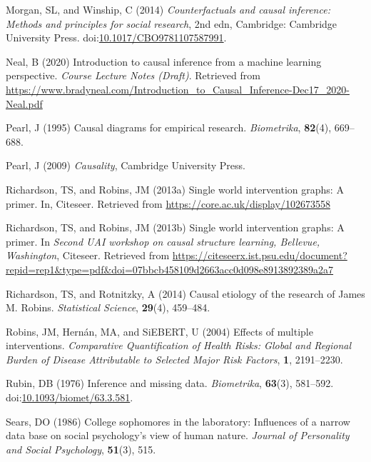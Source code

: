 \documentclass[
  single column]{article}
\newlength{\cslhangindent}
\newenvironment{CSLReferences}[2] %
 {\begin{list}{}{%
  \setlength{\itemindent}{0pt}
  \setlength{\leftmargin}{0pt}
  \setlength{\parsep}{0pt}
  \ifodd #1
   \setlength{\leftmargin}{\cslhangindent}
   \setlength{\itemindent}{-1\cslhangindent}
  \fi
  \setlength{\itemsep}{#2\baselineskip}}}
 {\end{list}}
\begin{document}
\begin{CSLReferences}{1}{0}
Morgan, SL, and Winship, C (2014) \emph{Counterfactuals and causal
inference: Methods and principles for social research}, 2nd edn,
Cambridge: Cambridge University Press.
doi:\href{https://doi.org/10.1017/CBO9781107587991}{10.1017/CBO9781107587991}.

Neal, B (2020) Introduction to causal inference from a machine learning
perspective. \emph{Course Lecture Notes (Draft)}. Retrieved from
\url{https://www.bradyneal.com/Introduction_to_Causal_Inference-Dec17_2020-Neal.pdf}

Pearl, J (1995) Causal diagrams for empirical research.
\emph{Biometrika}, \textbf{82}(4), 669--688.

Pearl, J (2009) \emph{Causality}, Cambridge University Press.

Richardson, TS, and Robins, JM (2013a) Single world intervention graphs:
A primer. In, Citeseer. Retrieved from
\url{https://core.ac.uk/display/102673558}

Richardson, TS, and Robins, JM (2013b) Single world intervention graphs:
A primer. In \emph{Second UAI workshop on causal structure learning,
{B}ellevue, {W}ashington}, Citeseer. Retrieved from
\url{https://citeseerx.ist.psu.edu/document?repid=rep1&type=pdf&doi=07bbcb458109d2663acc0d098e8913892389a2a7}

Richardson, TS, and Rotnitzky, A (2014) Causal etiology of the research
of {J}ames {M}. {R}obins. \emph{Statistical Science}, \textbf{29}(4),
459--484.

Robins, JM, Hernán, MA, and SiEBERT, U (2004) Effects of multiple
interventions. \emph{Comparative Quantification of Health Risks: Global
and Regional Burden of Disease Attributable to Selected Major Risk
Factors}, \textbf{1}, 2191--2230.

Rubin, DB (1976) Inference and missing data. \emph{Biometrika},
\textbf{63}(3), 581--592.
doi:\href{https://doi.org/10.1093/biomet/63.3.581}{10.1093/biomet/63.3.581}.

Sears, DO (1986) College sophomores in the laboratory: Influences of a
narrow data base on social psychology's view of human nature.
\emph{Journal of Personality and Social Psychology}, \textbf{51}(3),
515.


\end{CSLReferences}
\end{document}
